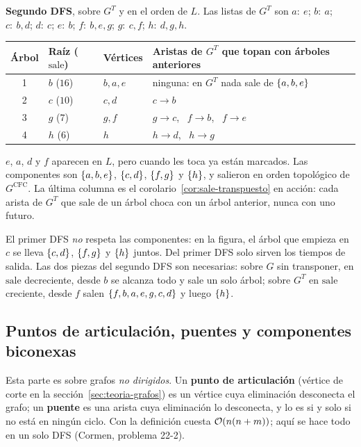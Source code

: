 \documentclass[11pt,letterpaper]{article}
\begin{document}
\begin{ejemplo}
  \textbf{Segundo DFS}, sobre $G^T$ y en el orden de $L$. Las listas
  de $G^T$ son $a{:}\ e$; $b{:}\ a$; $c{:}\ b, d$; $d{:}\ c$;
  $e{:}\ b$; $f{:}\ b, e, g$; $g{:}\ c, f$; $h{:}\ d, g, h$.
  \begin{center}
  \small
  \begin{tabular}{clll}
    \toprule
    \textbf{Árbol} & \textbf{Raíz ($\text{sale}$)} & \textbf{Vértices}
      & \textbf{Aristas de $G^T$ que topan con árboles anteriores} \\
    \midrule
    1 & $b$ ($16$) & $b, a, e$ & ninguna: en $G^T$ nada sale de
      $\left\{ a, b, e \right\}$ \\
    2 & $c$ ($10$) & $c, d$ & $c \to b$ \\
    3 & $g$ ($7$) & $g, f$ & $g \to c$, \ $f \to b$, \ $f \to e$ \\
    4 & $h$ ($6$) & $h$ & $h \to d$, \ $h \to g$ \\
    \bottomrule
  \end{tabular}
  \end{center}
  $e$, $a$, $d$ y $f$ aparecen en $L$, pero cuando les toca ya están
  marcados. Las componentes son $\left\{ a, b, e \right\}$, $\left\{ c, d \right\}$,
  $\left\{ f, g \right\}$ y $\left\{ h \right\}$, y salieron en orden topológico de
  $G^{\text{CFC}}$. La última columna es el
  corolario~\ref{cor:sale-transpuesto} en acción: cada arista de $G^T$
  que sale de un árbol choca con un árbol anterior, nunca con uno
  futuro.
\end{ejemplo}

\begin{ojo}
  El primer DFS \emph{no} respeta las componentes: en la figura, el
  árbol que empieza en $c$ se lleva $\left\{ c, d \right\}$, $\left\{ f, g \right\}$ y
  $\left\{ h \right\}$ juntos. Del primer DFS solo sirven los tiempos de salida.
  Las dos piezas del segundo DFS son necesarias: sobre $G$ sin
  transponer, en $\text{sale}$ decreciente, desde $b$ se alcanza todo y
  sale un solo árbol; sobre $G^T$ en $\text{sale}$ creciente, desde $f$
  salen $\left\{ f, b, a, e, g, c, d \right\}$ y luego $\left\{ h \right\}$.
\end{ojo}


\subsection*{Puntos de articulación, puentes y componentes biconexas}

Esta parte es sobre grafos \emph{no dirigidos}. Un \textbf{punto de
articulación} (vértice de corte en la sección~\ref{sec:teoria-grafos})
es un vértice cuya eliminación desconecta el grafo; un
\textbf{puente} es una arista cuya eliminación lo desconecta, y lo es
si y solo si no está en ningún ciclo. Con la definición cuesta
$\mathcal{O}\!\left(n(n + m)\right)$; aquí se hace todo en un solo DFS (Cormen, problema
22-2).
\end{document}
